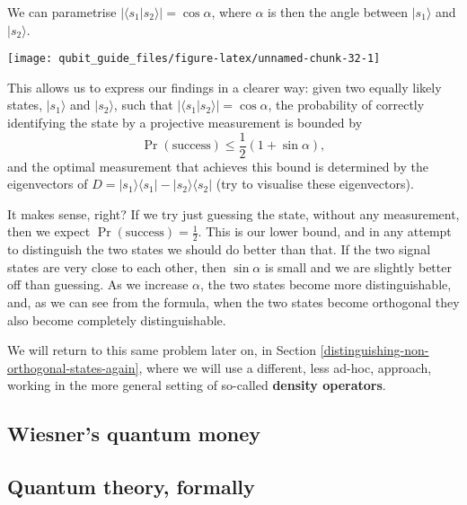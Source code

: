 \documentclass[fleqn]{article}
\renewcommand{\footnote}[1]{\en{#1}}
\begin{document}
We can parametrise \(|\langle s_1|s_2\rangle| = \cos\alpha\), where \(\alpha\) is then the angle between \(|s_1\rangle\) and \(|s_2\rangle\).

\begin{center}\texttt{[image: qubit\_guide\_files/figure-latex/unnamed-chunk-32-1]} \end{center}

This allows us to express our findings in a clearer way: given two equally likely states, \(|s_1\rangle\) and \(|s_2\rangle\), such that \(|\langle s_1|s_2\rangle| = \cos\alpha\), the probability of correctly identifying the state by a projective measurement is bounded by\footnote{Here we use that \(\cos^2\alpha+\sin^2\alpha=1\) for any \(\alpha\).}
\[
 \Pr (\text{success})
 \leqslant\frac{1}{2}(1 + \sin\alpha),
\]
and the optimal measurement that achieves this bound is determined by the eigenvectors of \(D = |s_1\rangle\langle s_1|-|s_2\rangle\langle s_2|\) (try to visualise these eigenvectors).

It makes sense, right?
If we try just guessing the state, without any measurement, then we expect \(\Pr (\text{success}) = \frac{1}{2}\).
This is our lower bound, and in any attempt to distinguish the two states we should do better than that.
If the two signal states are very close to each other, then \(\sin\alpha\) is small and we are slightly better off than guessing.
As we increase \(\alpha\), the two states become more distinguishable, and, as we can see from the formula, when the two states become orthogonal they also become completely distinguishable.

We will return to this same problem later on, in Section \ref{distinguishing-non-orthogonal-states-again}, where we will use a different, less ad-hoc, approach, working in the more general setting of so-called \textbf{density operators}.

\hypertarget{wiesners-quantum-money}{%
\subsection{Wiesner's quantum money}\label{wiesners-quantum-money}}

\hypertarget{quantum-theory-formally}{%
\subsection{Quantum theory, formally}\label{quantum-theory-formally}}
\end{document}
